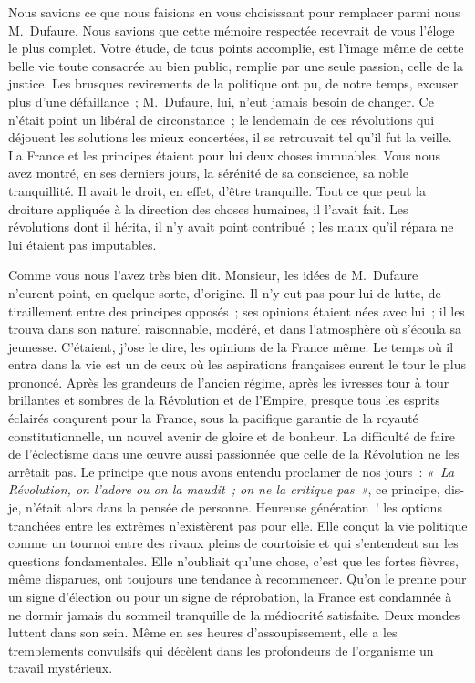 \documentclass[french,twoside]{book} %
\newcommand\orgName[1]{#1}
\newcommand\persName[1]{#1}
\newcommand{\salute}[1]{\bigbreak{#1}\par\medbreak}
\begin{document}
\salute{Monsieur,}
\noindent Nous savions ce que nous faisions en vous choisissant pour remplacer parmi nous {\persName M. Dufaure}. Nous savions que cette mémoire respectée recevrait de vous l’éloge le plus complet. Votre étude, de tous points accomplie, est l’image même de cette belle vie toute consacrée au bien public, remplie par une seule passion, celle de la justice. Les brusques revirements de la politique ont pu, de notre temps, excuser plus d’une défaillance ; {\persName M. Dufaure}, lui, n’eut jamais besoin de changer. Ce n’était point un libéral de circonstance ; le lendemain de ces révolutions qui déjouent les solutions les mieux concertées, il se retrouvait tel qu’il fut la veille. La {\orgName France} et les principes étaient pour lui deux choses immuables. Vous nous avez montré, en ses derniers jours, la sérénité de sa conscience, sa noble tranquillité. Il avait le droit, en effet, d’être tranquille. Tout ce que peut la droiture appliquée à la direction des choses humaines, il l’avait fait. Les révolutions dont il hérita, il n’y avait point contribué ; les maux qu’il répara ne lui étaient pas imputables.\par
Comme vous nous l’avez très bien dit. Monsieur, les idées de {\persName M. Dufaure} n’eurent point, en quelque sorte, d’origine. Il n’y eut pas pour lui de lutte, de tiraillement entre des principes opposés ; ses opinions étaient nées avec lui ; il les trouva dans son naturel raisonnable, modéré, et dans l’atmosphère où s’écoula sa jeunesse. C’étaient, j’ose le dire, les opinions de la {\orgName France} même. Le temps où il entra dans la vie est un de ceux où les aspirations françaises eurent le tour le plus prononcé. Après les grandeurs de l’ancien régime, après les ivresses tour à tour brillantes et sombres de la Révolution et de l’{\orgName Empire}, presque tous les esprits éclairés conçurent pour la {\orgName France}, sous la pacifique garantie de la royauté constitutionnelle, un nouvel avenir de gloire et de bonheur. La difficulté de faire de l’éclectisme dans une œuvre aussi passionnée que celle de la Révolution ne les arrêtait pas. Le principe que nous avons entendu proclamer de nos jours : \emph{« La Révolution, on l’adore ou on la maudit ; on ne la critique pas »}, ce principe, dis-je, n’était alors dans la pensée de personne. Heureuse génération ! les options tranchées entre les extrêmes n’existèrent pas pour elle. Elle conçut la vie politique comme un tournoi entre des rivaux pleins de courtoisie et qui s’entendent sur les questions fondamentales. Elle n’oubliait qu’une chose, c’est que les fortes fièvres, même disparues, ont toujours une tendance à recommencer. Qu’on le prenne pour un signe d’élection ou pour un signe de réprobation, la {\orgName France} est condamnée à ne dormir jamais du sommeil tranquille de la médiocrité satisfaite. Deux mondes luttent dans son sein. Même en ses heures d’assoupissement, elle a les tremblements convulsifs qui décèlent dans les profondeurs de l’organisme un travail mystérieux.\par
\end{document}
